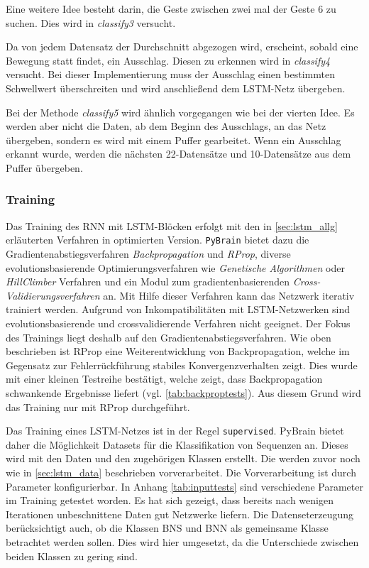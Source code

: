 Eine weitere Idee besteht darin, die Geste zwischen zwei mal der Geste 6 zu 
suchen. Dies wird in \textit{classify3} versucht.

Da von jedem Datensatz der Durchschnitt abgezogen wird, erscheint, sobald eine 
Bewegung statt findet, ein Ausschlag. Diesen zu erkennen wird in \textit{classify4} 
versucht. Bei dieser Implementierung muss der Ausschlag einen bestimmten Schwellwert 
überschreiten und wird anschließend dem LSTM-Netz übergeben.

Bei der Methode \textit{classify5} wird ähnlich vorgegangen wie bei der vierten 
Idee. Es werden aber nicht die Daten, ab dem Beginn des Ausschlags, an das 
Netz übergeben, sondern es wird mit einem Puffer gearbeitet. Wenn ein Ausschlag erkannt 
wurde, werden die nächsten 22-Datensätze und 10-Datensätze aus dem Puffer übergeben.

\subsubsection{Training}
\label{sec:lstm_training}
Das Training des \ac{RNN} mit \ac{LSTM}-Blöcken erfolgt mit den in
\autoref{sec:lstm_allg} erläuterten Verfahren in optimierten Version.
\texttt{PyBrain} bietet dazu die Gradientenabstiegsverfahren
\textit{Backpropagation} und \textit{\ac{RProp}}, diverse evolutionsbasierende
Optimierungsverfahren wie \textit{Genetische Algorithmen} oder
\textit{HillClimber} Verfahren und ein Modul zum gradientenbasierenden
\textit{Cross-Validierungsverfahren} an. Mit Hilfe dieser Verfahren kann das
Netzwerk iterativ trainiert werden. Aufgrund von Inkompatibilitäten mit
\ac{LSTM}-Netzwerken sind evolutionsbasierende und crossvalidierende Verfahren
nicht geeignet. Der Fokus des Trainings liegt deshalb auf den
Gradientenabstiegsverfahren. Wie oben beschrieben ist \ac{RProp} eine
Weiterentwicklung von Backpropagation, welche im Gegensatz zur Fehlerrückführung
stabiles Konvergenzverhalten zeigt. Dies wurde mit einer kleinen Testreihe
bestätigt, welche zeigt, dass Backpropagation schwankende Ergebnisse liefert
(vgl. \autoref{tab:backproptests}). Aus diesem Grund wird das Training nur mit
\ac{RProp} durchgeführt.
 
Das Training eines \ac{LSTM}-Netzes ist in der Regel \texttt{supervised}.
PyBrain bietet daher die Möglichkeit Datasets für die Klassifikation von
Sequenzen an. Dieses wird mit den Daten und den zugehörigen Klassen erstellt.
Die werden zuvor noch wie in \autoref{sec:lstm_data} beschrieben vorverarbeitet.
Die Vorverarbeitung ist durch Parameter konfigurierbar. In Anhang
\autoref{tab:inputtests} sind verschiedene Parameter im Training getestet
worden. Es hat sich gezeigt, dass bereits nach wenigen Iterationen unbeschnittene
Daten gut Netzwerke liefern. Die Datenseterzeugung berücksichtigt auch, ob die
Klassen \ac{BNS} und \ac{BNN} als gemeinsame Klasse betrachtet werden sollen.
Dies wird hier umgesetzt, da die Unterschiede zwischen beiden Klassen zu gering
sind. 

